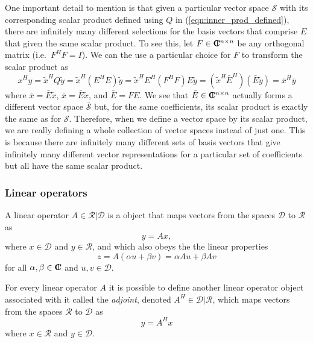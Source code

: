 One important detail to mention is that given a particular vector space
$\mathcal{S}$ with its corresponding scalar product defined using $Q$ in
(\ref{eqn:inner_prod_defined}), there are infinitely many different selections
for the basis vectors that comprise $E$ that given the same scalar product.
To see this, let $F\in\mbox{\textbf{C}}\hspace{-1.1ex}\mbox{l}\hspace{0.4ex}^{n\times{}n}$ be any orthogonal matrix (i.e.\ $F^H
F = I$).  We can the use a particular choice for $F$ to transform the scalar
product as
%
\begin{equation}
x^H y = \tilde{x}^H Q \tilde{y}
= \tilde{x}^H ( E^H E ) \tilde{y}
= \tilde{x}^H E^H ( F^H F ) E \tilde{y}
= ( \tilde{x}^H \bar{E}^H ) ( \bar{E} \tilde{y} )
= \bar{x}^H \bar{y}
\label{eqn:inner_x_y_F_E_prod}
\end{equation}
%
where $\bar{x} = {}\bar{E} {}\tilde{x}$, $\bar{x} = {}\bar{E} {}\tilde{x}$,
and $\bar{E} = F E$.  We see that $\bar{E}\in\mbox{\textbf{C}}\hspace{-1.1ex}\mbox{l}\hspace{0.4ex}^{n\times{}n}$ actually forms
a different vector space $\bar{\mathcal{S}}$ but, for the same coefficients,
its scalar product is exactly the same as for $\mathcal{S}$.  Therefore, when
we define a vector space by its scalar product, we are really defining a whole
collection of vector spaces instead of just one.  This is because there are
infinitely many different sets of basis vectors that give infinitely many
different vector representations for a particular set of coefficients but all
have the same scalar product.

\subsubsection{Linear operators}

A linear operator $A\in\mathcal{R}|\mathcal{D}$ is a object that maps vectors
from the spaces $\mathcal{D}$ to $\mathcal{R}$ as
%
\begin{equation}
y = A x,
\label{eqn:fwd_op_apply}
\end{equation}
%
where $x\in\mathcal{D}$ and $y\in\mathcal{R}$, and which also obeys the the
linear properties
%
\begin{equation}
z = A(\alpha u + \beta v) = \alpha A u + \beta A v
\label{eqn:linear_op_properties}
\end{equation}
%
for all $\alpha,\beta\in\mbox{\textbf{C}}\hspace{-1.1ex}\mbox{l}\hspace{0.4ex}$ and $u,v\in\mathcal{D}$.

For every linear operator $A$ it is possible to define another linear operator
object associated with it called the {}\textit{adjoint}, denoted
$A^H\in\mathcal{D}|\mathcal{R}$, which maps vectors from the spaces
$\mathcal{R}$ to $\mathcal{D}$ as
%
\begin{equation}
y = A^H x
\label{eqn:adjoint_op_apply}
\end{equation}
%
where $x\in\mathcal{R}$ and $y\in\mathcal{D}$.


